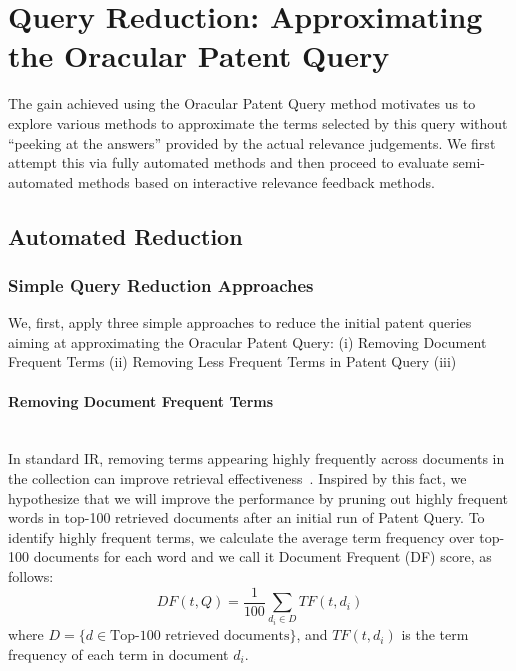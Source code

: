 \section{Query Reduction: Approximating the Oracular Patent Query}
\label{sec: QR}
The gain achieved using the Oracular Patent Query method motivates us to explore various methods to approximate the terms
selected by this query without ``peeking at the answers'' provided by
the actual relevance judgements.  We first attempt this via fully
automated methods and then proceed to evaluate semi-automated methods
based on interactive relevance feedback methods.
\subsection{Automated Reduction}
\label{AutomatedReduction}
\subsubsection{Simple Query Reduction Approaches}
\label{SimpleApproaches}
We, first, apply three simple approaches to reduce the initial patent queries aiming at approximating the Oracular Patent Query: (i) Removing Document Frequent Terms (ii) Removing Less Frequent Terms in Patent Query (iii)
\paragraph{Removing Document Frequent Terms}
\ \\
In standard IR, removing terms appearing highly frequently across documents in the collection can improve retrieval effectiveness~\citep{manning2008introduction}. Inspired by this fact, we hypothesize that we will improve the performance by pruning out highly frequent words in top-100 retrieved documents after an initial run of Patent Query. To identify highly frequent terms, we calculate the average term frequency over top-100 documents for each word and we call it Document Frequent (DF) score, as follows:
\begin{equation}
 DF(t, Q)=\frac{1}{100}\sum_{d_i\in  D} TF(t, d_i)    
 \label{eq:df}
\end{equation}
where $D=\{d\in \mbox{Top-100 retrieved documents}\}$, and $TF(t, d_i)$ is the term frequency of each term in document $d_i$.


